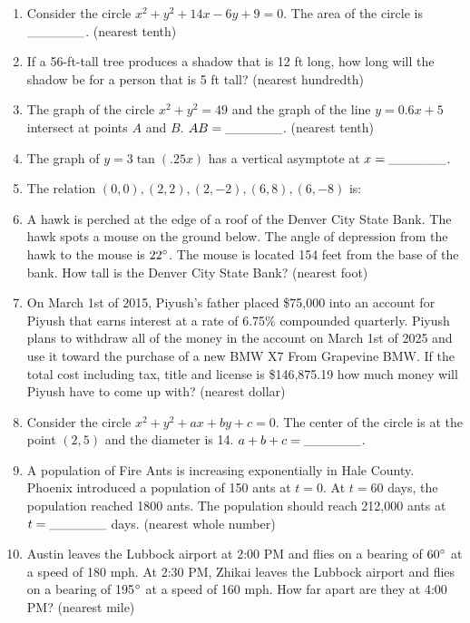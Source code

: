 \documentclass[../uilmath.tex]{subfiles}
\begin{document}
\begin{enumerate}[label=\bfseries\arabic*.]
    \item %
    Consider the circle $x^2+y^2+14x-6y+9=0$. The area of the circle is $\_\_\_\_\_\_$. (nearest tenth)

    \item %
    If a 56-ft-tall tree produces a shadow that is 12 ft long, how long will the shadow be for a person that is 5 ft tall? (nearest hundredth)

    \item %
    The graph of the circle $x^2+y^2=49$ and the graph of the line $y=0.6x+5$ intersect at points $A$ and $B$. $AB=\_\_\_\_\_\_$. (nearest tenth)

    \item %
    The graph of $y=3\tan(.25x)$ has a vertical asymptote at $x=\_\_\_\_\_\_$.

    \item %
    The relation ${(0,0), (2,2), (2,-2), (6,8), (6,-8)}$ is:

    \item %
    A hawk is perched at the edge of a roof of the Denver City State Bank. The hawk spots a mouse on the ground below. The angle of depression from the hawk to the 
    mouse is $22\degree$. The mouse is located 154 feet from the base of the bank. How tall is the Denver City State Bank? (nearest foot)

    \item %
    On March 1st of 2015, Piyush's father placed \$75,000 into an account for Piyush that earns interest at a rate of 6.75\% compounded 
    quarterly. Piyush plans to withdraw all of the money in the account on March 1st of 2025 and use it toward the purchase of a new BMW X7 From 
    Grapevine BMW. If the total cost including tax, title and license is \$146,875.19 how much money will Piyush have to come up with? (nearest dollar)

    \item %
    Consider the circle $x^2+y^2+ax+by+c=0$. The center of the circle is at the point $(2,5)$ and the diameter is 14. $a+b+c=\_\_\_\_\_\_$.

    \item %
    A population of Fire Ants is increasing exponentially in Hale County. Phoenix introduced a population of 150 ants at $t=0$. 
    At $t=60$ days, the population reached 1800 ants. The population should reach 212,000 ants at $t=\_\_\_\_\_\_$ days. (nearest whole number)

    \item %
    Austin leaves the Lubbock airport at 2:00 PM and flies on a bearing of $60\degree$ at a speed of 180 mph. At 2:30 PM, Zhikai 
    leaves the Lubbock airport and flies on a bearing of 195$\degree$ at a speed of 160 mph. How far apart are they at 4:00 PM? (nearest mile)


\end{enumerate}
\end{document}
